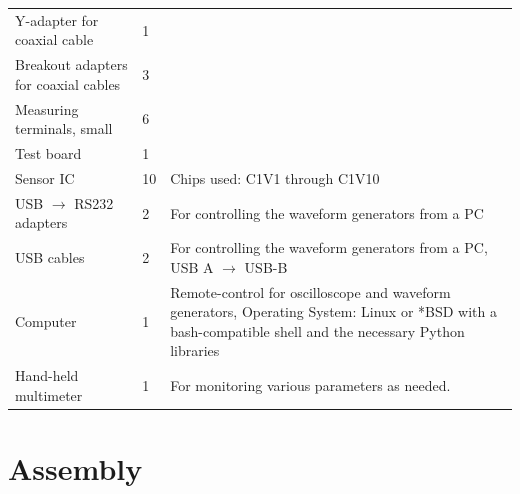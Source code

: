 \begin{centering}
\begin{xtabular}{
    >{\small}p{50mm}
    >{\small}p{8mm}
    >{\small}p{65mm}
}
    Y-adapter for coaxial cable &
    1                           &
    \\

    Breakout adapters for coaxial cables &
    3                                    &
    \\

    Measuring terminals, small &
    6                          &
    \\

    Test board &
    1          &
    \\

    Sensor IC                       &
    10                              &
    Chips used: C1V1 through C1V10  \\

    USB $\rightarrow$ RS232 adapters                  &
    2                                                 &
    For controlling the waveform generators from a PC \\

    USB cables                                        &
    2                                                 &
    For controlling the waveform generators from a PC,
    USB A $\rightarrow$ USB-B                         \\

    Computer                                                  &
    1                                                         &
    Remote-control for oscilloscope and waveform generators,
    Operating System: Linux  or *BSD with  a bash-compatible
    shell and the necessary Python libraries                  \\

    Hand-held multimeter                         &
    1                                            &
    For monitoring various parameters as needed. \\

    \bottomrule
\end{xtabular}
\end{centering}


\section{Assembly}
\label{sec:assembly}

